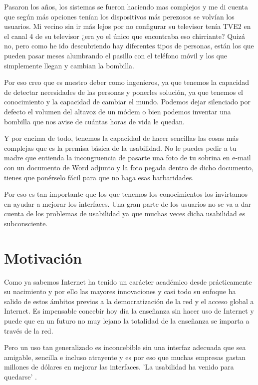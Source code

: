 \bigskip
Pasaron los años, los sistemas se fueron haciendo mas complejos y me di cuenta que según más opciones tenían los dispositivos más perezosos se volvían los usuarios. Mi vecino sin ir más lejos por no configurar su televisor tenía TVE2 en el canal 4 de su televisor ¿era yo el único que encontraba eso chirriante? Quizá no, pero como he ido descubriendo hay diferentes tipos de personas, están los que pueden pasar meses alumbrando el pasillo con el teléfono móvil y los que simplemente llegan y cambian la bombilla. 

\bigskip
Por eso creo que es nuestro deber como ingenieros, ya que tenemos la capacidad de detectar necesidades de las personas y ponerles solución, ya que tenemos el conocimiento y la capacidad de cambiar el mundo. Podemos dejar silenciado por defecto el volumen del altavoz de un módem o bien podemos inventar una bombilla que nos avise de cuántas horas de vida le quedan.

\bigskip
Y por encima de todo, tenemos la capacidad de hacer sencillas las cosas más complejas que es la premisa básica de la usabilidad. No le puedes pedir a tu madre que entienda la incongruencia de pasarte una foto de tu sobrina en e-mail con un documento de Word adjunto y la foto pegada dentro de dicho documento, tienes que ponérselo fácil para que no haga esas barbaridades.

\bigskip
Por eso es tan importante que los que tenemos los conocimientos los invirtamos en ayudar a mejorar los interfaces. Una gran parte de los usuarios no se va a dar cuenta de los problemas de usabilidad ya que muchas veces dicha usabilidad es subconsciente.

\section{Motivación}

Como ya sabemos Internet ha tenido un carácter académico desde prácticamente su nacimiento y por ello las mayores innovaciones y casi todo su enfoque ha salido de estos ámbitos previos a la democratización de la red y el acceso global a Internet. Es impensable concebir hoy día la enseñanza sin hacer uso de Internet y puede que en un futuro no muy lejano la totalidad de la enseñanza se imparta a través de la red.

\bigskip
Pero un uso tan generalizado es inconcebible sin una interfaz adecuada que sea amigable, sencilla e incluso atrayente y es por eso que muchas empresas gastan millones de dólares en mejorar las interfaces. 'La usabilidad ha venido para quedarse' \cite{jakonielsen}.


